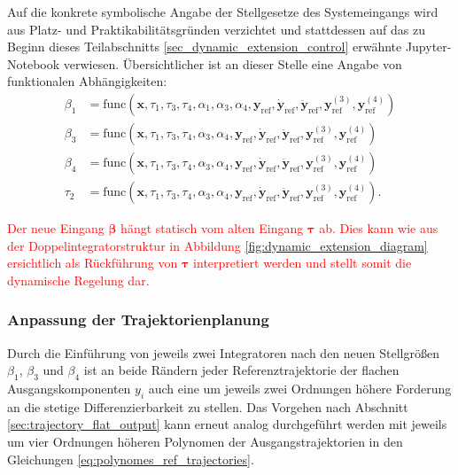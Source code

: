 Auf die konkrete symbolische Angabe der Stellgesetze des Systemeingangs wird aus Platz- und Praktikabilitätsgründen verzichtet und stattdessen auf das zu Beginn dieses Teilabschnitts \ref{sec_dynamic_extension_control} erwähnte Jupyter-Notebook verwiesen. Übersichtlicher ist an dieser Stelle eine Angabe von funktionalen Abhängigkeiten:
\begin{subequations}
	\begin{align}
		\beta_1 &= \mathrm{func}(\mathbf{x}, \tau_1, \tau_3, \tau_4, \alpha_1, \alpha_3, \alpha_4, \mathbf{y}_{\mathrm{ref}}, \dot{\mathbf{y}}_{\mathrm{ref}}, \ddot{\mathbf{y}}_{\mathrm{ref}}, \mathbf{y}_{\mathrm{ref}}^{(3)}, \mathbf{y}_{\mathrm{ref}}^{(4)}) \\
		\beta_3 &= \mathrm{func}(\mathbf{x}, \tau_1, \tau_3, \tau_4, \alpha_3, \alpha_4, \mathbf{y}_{\mathrm{ref}}, \dot{\mathbf{y}}_{\mathrm{ref}}, \ddot{\mathbf{y}}_{\mathrm{ref}}, \mathbf{y}_{\mathrm{ref}}^{(3)}, \mathbf{y}_{\mathrm{ref}}^{(4)}) \\
		\beta_4 &= \mathrm{func}(\mathbf{x}, \tau_1, \tau_3, \tau_4, \alpha_3, \alpha_4, \mathbf{y}_{\mathrm{ref}}, \dot{\mathbf{y}}_{\mathrm{ref}}, \ddot{\mathbf{y}}_{\mathrm{ref}}, \mathbf{y}_{\mathrm{ref}}^{(3)}, \mathbf{y}_{\mathrm{ref}}^{(4)}) \\
		\tau_2 &= \mathrm{func}(\mathbf{x}, \tau_1, \tau_3, \tau_4, \alpha_3, \alpha_4, \mathbf{y}_{\mathrm{ref}}, \dot{\mathbf{y}}_{\mathrm{ref}}, \ddot{\mathbf{y}}_{\mathrm{ref}}, \mathbf{y}_{\mathrm{ref}}^{(3)}, \mathbf{y}_{\mathrm{ref}}^{(4)}).
	\end{align}
\end{subequations}

\textcolor{red}{Der neue Eingang $\boldsymbol{\beta}$ hängt statisch vom alten Eingang $\boldsymbol{\tau}$ ab. Dies kann wie aus der Doppelintegratorstruktur in Abbildung \ref{fig:dynamic_extension_diagram} ersichtlich als Rückführung von $\boldsymbol{\tau}$ interpretiert werden und stellt somit die dynamische Regelung dar.}

\subsubsection{Anpassung der Trajektorienplanung}
Durch die Einführung von jeweils zwei Integratoren nach den neuen Stellgrößen $\beta_1$, $\beta_3$ und $\beta_4$ ist an beide Rändern jeder Referenztrajektorie der flachen Ausgangskomponenten $y_i$ auch eine um  jeweils zwei Ordnungen höhere Forderung an die stetige Differenzierbarkeit zu stellen. Das Vorgehen nach Abschnitt \ref{sec:trajectory_flat_output} kann erneut analog durchgeführt werden mit jeweils um vier Ordnungen höheren Polynomen der Ausgangstrajektorien in den Gleichungen \eqref{eq:polynomes_ref_trajectories}.


